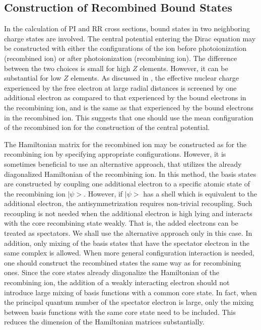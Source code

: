 \documentclass{elsart}
\begin{document}
\subsection{Construction of Recombined Bound States}
In the calculation of PI and RR cross sections, bound states in two
neighboring charge 
states are involved. The central potential entering the Dirac equation may be
constructed with either the configurations of the ion before photoionization
(recombined ion) or after photoionization (recombining ion). The difference
between the two choices is small for high $Z$ elements. However, it can be
substantial for low $Z$ elements. As discussed in , the
effective nuclear charge experienced by the free electron at large radial
distances is screened by one additional electron as compared to that
experienced by the bound electrons in the
recombining ion, and is the same as that experienced by the bound electrons in
the recombined ion. This suggests that
one should use the mean configuration of the recombined ion for the
construction of the central potential. 

The Hamiltonian matrix for the recombined ion may be constructed as for the
recombining ion by specifying appropriate configurations. However, it is
sometimes beneficial to use an alternative approach, that utilizes the already
diagonalized Hamiltonian of the recombining ion. In this method, the basis
states are constructed by coupling one additional electron to a specific
atomic state 
of the recombining ion $|\psi>$. However, if $|\psi>$ has a shell which is
equivalent to the additional electron, the antisymmetrization requires
non-trivial recoupling. Such recoupling is not needed when the additional
electron is high lying and interacts with the core recombining state
weakly. That is, the added electrons can be treated as spectators. We shall use
the alternative approach only in this case. In addition, only 
mixing of the basis states that have the spectator electron in the same
complex is 
allowed. When more general configuration interaction is needed, one should
construct the recombined states the same way as for recombining ones.
Since the core states already diagonalize the Hamiltonian of the
recombining ion, the addition of a weakly interacting electron should not
introduce large mixing of basis functions with a common core state. In fact,
when the 
principal quantum number of the spectator electron is large, only the mixing
between basis functions with the same core state need to be included. This
reduces the dimension of the Hamiltonian matrices substantially. 
\end{document}
